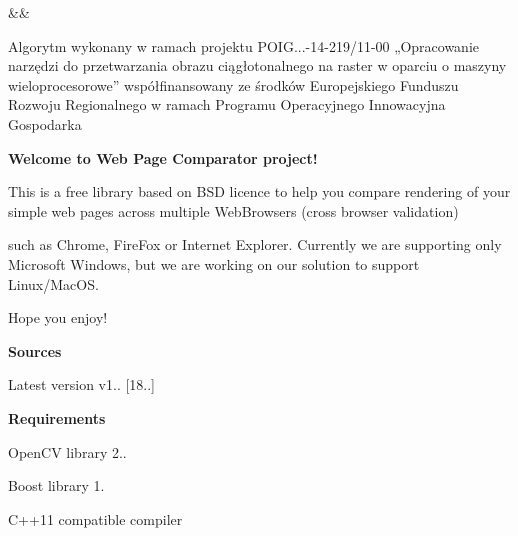 \begin{TabularC}{3}
\hline
 &&  \\
\end{TabularC}
Algorytm wykonany w ramach projektu P\-O\-I\-G...-\/14-\/219/11-\/00 „\-Opracowanie narzędzi do przetwarzania obrazu ciągłotonalnego na raster w oparciu o maszyny wieloprocesorowe” współfinansowany ze środków Europejskiego Funduszu Rozwoju Regionalnego w ramach Programu Operacyjnego Innowacyjna Gospodarka\par


{\bfseries Welcome to Web Page Comparator project!}\par
 \par
 This is a free library based on B\-S\-D licence to help you compare rendering of your simple web pages across multiple Web\-Browsers (cross browser validation)\par
 such as Chrome, Fire\-Fox or Internet Explorer. Currently we are supporting only Microsoft Windows, but we are working on our solution to support Linux/\-Mac\-O\-S.\par
\par
 \par
 Hope you enjoy! \par
 \par
 {\bfseries Sources} \par
 Latest version v1.. \mbox{[}18..\mbox{]} \par
\par
 \par
 {\bfseries Requirements} 
\begin{DoxyItemize}
\item Open\-C\-V library 2.. 
\item Boost library 1.  
\item C++11 compatible compiler 
\end{DoxyItemize}

